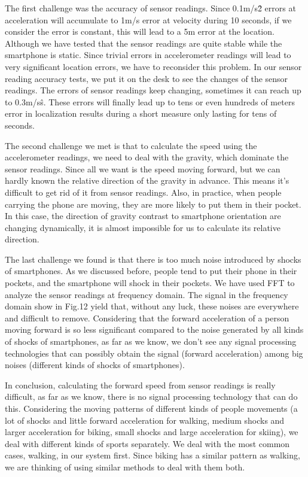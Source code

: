 \documentclass[journal]{IEEEtran}
\begin{document}
The first challenge was the accuracy of sensor readings.
Since 0.1m/s\^2 errors at acceleration will accumulate to 1m/s error at velocity during 10 seconds, if we consider the error is constant, this will lead to a 5m error at the location.
Although we have tested that the sensor readings are quite stable while the smartphone is static. 
Since trivial errors in accelerometer readings will lead to very significant location errors, we have to reconsider this problem.
In our sensor reading accuracy tests, we put it on the desk to see the changes of the sensor readings. 
The errors of sensor readings keep changing, sometimes it can reach up to 0.3m/s\^s. 
These errors will finally lead up to tens or even hundreds of meters error in localization results during a short measure only lasting for tens of seconds.

The second challenge we met is that to calculate the speed using the accelerometer readings, we need to deal with the gravity, which dominate the sensor readings.
Since all we want is the speed moving forward, but we can hardly known the relative direction of the gravity in advance. 
This means it's difficult to get rid of it from sensor readings.
Also, in practice, when people carrying the phone are moving, they are more likely to put them in their pocket.
In this case, the direction of gravity contrast to smartphone orientation are changing dynamically, it is almost impossible for us to calculate its relative direction.

The last challenge we found is that there is too much noise introduced by shocks of smartphones. 
As we discussed before, people tend to put their phone in their pockets, and the smartphone will shock in their pockets.
We have used FFT to analyze the sensor readings at frequency domain. 
The signal in the frequency domain show in Fig.12 yield that, without any luck, these noises are everywhere and difficult to remove.
Considering that the forward acceleration of a person moving forward is so less significant compared to the noise generated by all kinds of shocks of smartphones, as far as we know, we don't see any signal processing technologies that can possibly obtain the signal (forward acceleration) among big noises (different kinds of shocks of smartphones).

In conclusion, calculating the forward speed from sensor readings is really difficult, as far as we know, there is no signal processing technology that can do this.
Considering the moving patterns of different kinds of people movements (a lot of shocks and little forward acceleration for walking, medium shocks and larger acceleration for biking, small shocks and large acceleration for skiing), we deal with different kinds of sports separately.
We deal with the most common cases, walking, in our system first.
Since biking has a similar pattern as walking, we are thinking of using similar methods to deal with them both.
\end{document}
